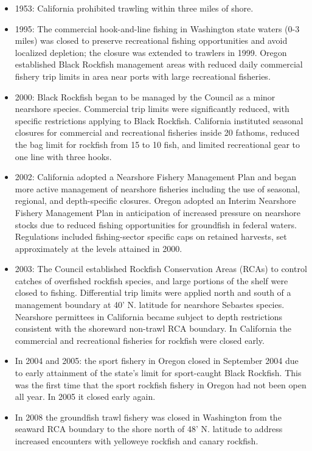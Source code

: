 \documentclass[11pt,
  english,
  letterpaper,
]{article}
\providecommand{\tightlist}{%
  \setlength{\itemsep}{0pt}\setlength{\parskip}{0pt}}
\providecommand{\tightlist}{%
  \setlength{\itemsep}{0pt}\setlength{\parskip}{0pt}}
\begin{document}
\begin{itemize}
\tightlist
\item
  1953: California prohibited trawling within three miles of shore.
\item
  1995: The commercial hook-and-line fishing in Washington state waters (0-3 miles) was closed to preserve recreational fishing opportunities and avoid localized depletion; the closure was extended to trawlers in 1999. Oregon established Black Rockfish management areas with reduced daily commercial fishery trip limits in area near ports with large recreational fisheries.
\item
  2000: Black Rockfish began to be managed by the Council as a minor nearshore species. Commercial trip limits were significantly reduced, with specific restrictions applying to Black Rockfish. California instituted seasonal closures for commercial and recreational fisheries inside 20 fathoms, reduced the bag limit for rockfish from 15 to 10 fish, and limited recreational gear to one line with three hooks.
\item
  2002: California adopted a Nearshore Fishery Management Plan and began more active management of nearshore fisheries including the use of seasonal, regional, and depth-specific closures. Oregon adopted an Interim Nearshore Fishery Management Plan in anticipation of increased pressure on nearshore stocks due to reduced fishing opportunities for groundfish in federal waters. Regulations included fishing-sector specific caps on retained harvests, set approximately at the levels attained in 2000.
\item
  2003: The Council established Rockfish Conservation Areas (RCAs) to control catches of overfished rockfish species, and large portions of the shelf were closed to fishing. Differential trip limits were applied north and south of a management boundary at 40' N. latitude for nearshore Sebastes species. Nearshore permittees in California became subject to depth restrictions consistent with the shoreward non-trawl RCA boundary. In California the commercial and recreational fisheries for rockfish were closed early.
\item
  In 2004 and 2005: the sport fishery in Oregon closed in September 2004 due to early attainment of the state's limit for sport-caught Black Rockfish. This was the first time that the sport rockfish fishery in Oregon had not been open all year. In 2005 it closed early again.
\item
  In 2008 the groundfish trawl fishery was closed in Washington from the seaward RCA boundary to the shore north of 48' N. latitude to address increased encounters with yelloweye rockfish and canary rockfish.
\end{itemize}
\end{document}
